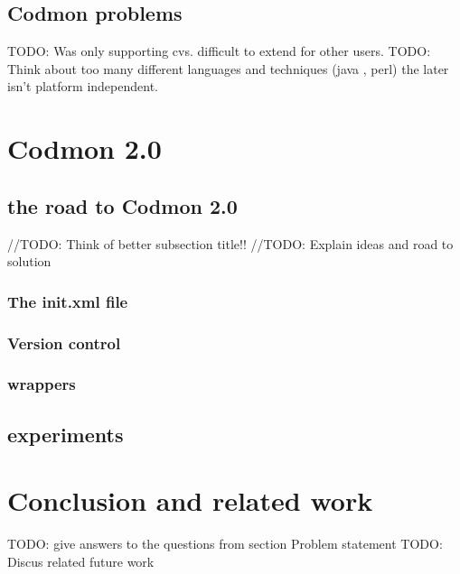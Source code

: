 \documentclass[a4paper,10pt]{scrartcl}
\newcommand{\project}{Codmon 2.0}
\begin{document}
\subsection{Codmon problems}
\label{subsec:CodmonProblems}
TODO: Was only supporting cvs. difficult to extend for other users.
TODO: Think about too many different languages and techniques (java , perl) the later isn't platform independent.


\newpage
\section{\project{}}
\label{sec:Codmon2.0}

\subsection{the road to \project{}}
//TODO: Think of better subsection title!!
//TODO: Explain ideas and road to solution

\subsubsection{The init.xml file}
\label{subsec:init}

\subsubsection{Version control}
\label{subsec:versionControl}

\subsubsection{wrappers}
\label{subsec:wrappers}

\subsection{experiments}
\label{sec:experiments}

\newpage

\section{Conclusion and related work}
\label{sec:conclusion}
TODO: give answers to the questions from section Problem statement
TODO: Discus related future work
\newpage


\end{document}
